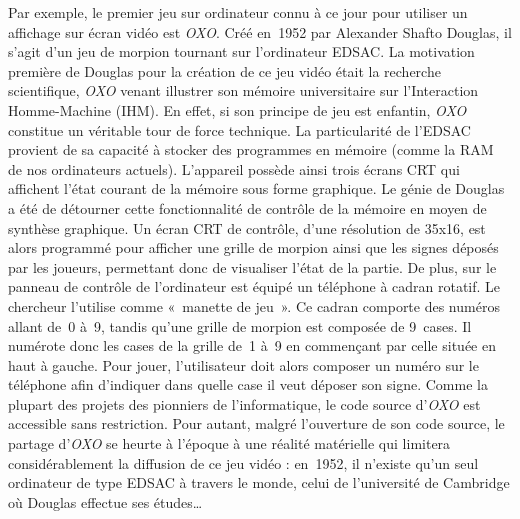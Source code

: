 \documentclass{FramateX}
\begin{document}
\begin{refsection}
Par exemple, le premier jeu sur
ordinateur connu à ce jour pour utiliser un affichage sur écran vidéo
est \textit{OXO}. Créé en~1952 par Alexander
Shafto Douglas, il s'agit d'un jeu de morpion tournant sur l'ordinateur
 EDSAC. La motivation première de
Douglas pour la création de ce jeu vidéo était la recherche
scientifique, \textit{OXO} venant illustrer
son mémoire universitaire sur l'Interaction Homme-Machine (IHM). En
effet, si son principe de jeu est enfantin, \textit{OXO} constitue un véritable tour de
force technique. La particularité de
l'EDSAC provient de sa capacité à
stocker des programmes en mémoire (comme la RAM de nos ordinateurs
actuels). L'appareil possède ainsi trois écrans CRT qui affichent
l'état courant de la mémoire sous forme graphique. Le génie de Douglas
a été de détourner cette fonctionnalité de contrôle de la mémoire en
moyen de synthèse graphique. Un écran CRT de contrôle, d'une résolution
de 35x16, est alors programmé pour afficher une grille de morpion ainsi
que les signes déposés par les joueurs, permettant donc de visualiser
l'état de la partie. De plus, sur le panneau de contrôle de
l'ordinateur est équipé un téléphone à cadran rotatif. Le chercheur
l'utilise comme «~manette de jeu~». Ce cadran comporte des numéros
allant de~0 à~9, tandis qu'une grille de morpion est composée de
9~cases. Il numérote donc les cases de la grille de~1 à~9 en commençant
par celle située en haut à gauche. Pour jouer, l'utilisateur doit alors
composer un numéro sur le téléphone afin d'indiquer dans quelle case il
veut déposer son signe. Comme la plupart des projets des pionniers de
l'informatique, le code source d'\textit{OXO} est accessible sans restriction. Pour autant, malgré l'ouverture de
son code source, le partage d'\textit{OXO} se heurte à l'époque à une
réalité matérielle qui limitera considérablement la diffusion de ce jeu
vidéo : en~1952, il n'existe qu'un seul ordinateur de type EDSAC à travers le monde, celui de
l'université de Cambridge où Douglas effectue
ses études…



\end{refsection}
\end{document}

